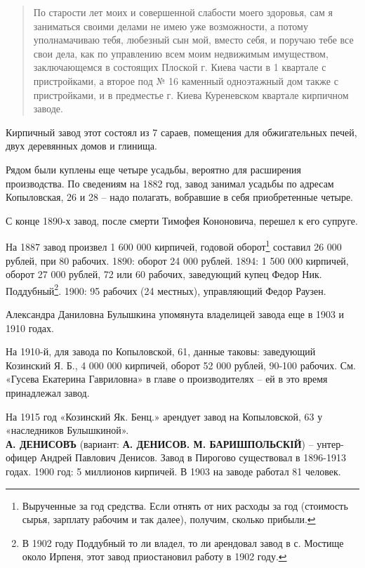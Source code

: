\begin{quotation}
По старости лет моих и совершенной слабости моего здоровья, сам я заниматься своими делами не имею уже возможности, а потому уполнамачиваю тебя, любезный сын мой, вместо себя, и поручаю тебе все свои дела, как по управлению всем моим недвижимым имуществом, заключающемся в состоящих Плоской г. Киева части в 1 квартале с пристройками, а второе под № 16 каменный одноэтажный дом также с пристройками, и в предместье г. Киева Куреневском квартале кирпичном заводе.
\end{quotation}

Кирпичный завод этот состоял из 7 сараев, помещения для обжигательных печей, двух деревянных домов и глинища.

Рядом были куплены еще четыре усадьбы, вероятно для расширения производства. По сведениям на 1882 год, завод занимал усадьбы по адресам Копыловская, 26 и 28 – надо полагать, вобравшие в себя приобретенные четыре.

С конце 1890-х завод, после смерти Тимофея Кононовича, перешел к его супруге. 

На 1887 завод произвел 1 600 000 кирпичей, годовой оборот\footnote{Вырученные за год средства. Если отнять от них расходы за год (стоимость сырья, зарплату рабочим и так далее), получим, сколько прибыли.} составил 26 000 рублей, при 80 рабочих. 1890: оборот 24 000 рублей. 1894: 1 500 000 кирпичей, оборот 27 000 рублей, 72 или 60 рабочих, заведующий купец Федор Ник. Поддубный\footnote{В 1902 году Поддубный то ли владел, то ли арендовал завод в с. Мостище около Ирпеня, этот завод приостановил работу в 1902 году.}. 1900: 95 рабочих (24 местных), управляющий Федор Раузен. 

Александра Даниловна Булышкина упомянута владелицей завода еще в 1903 и 1910 годах. 

На 1910-й, для завода по Копыловской, 61, данные таковы: заведующий Козинский Я. Б., 4 000 000 кирпичей, оборот 52 000 рублей, 90-100 рабочих. См. «Гусева Екатерина Гавриловна» в главе о производителях – ей в это время принадлежал завод.

На 1915 год «Козинский Як. Бенц.» арендует завод на Копыловской, 63 у «наследников Булышкиной».\\

\noindent\textbf{А. ДЕНИСОВЪ} (вариант: \textbf{А. ДЕНИСОВ. М. БАРИШ\-ПОЛЬСКІЙ}) – унтер-офицер Андрей Павлович Денисов. Завод в Пирогово существовал в 1896-1913 годах. 1900 год: 5 миллионов кирпичей. В 1903 на заводе работал 81 человек.\\

